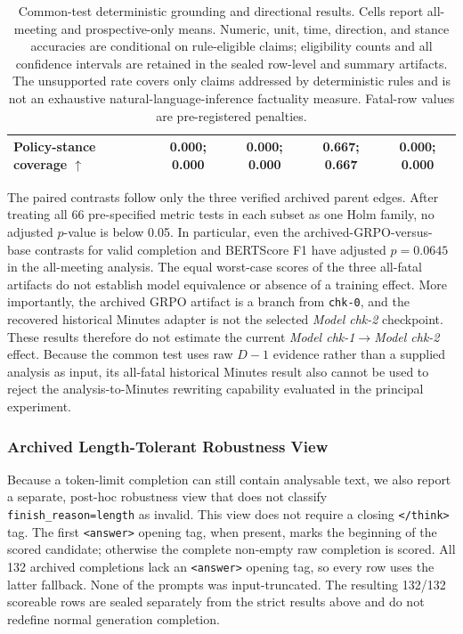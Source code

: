 \begin{table}[htbp]
\begin{tabular}{p{} c c c c}
        Policy-stance coverage $\uparrow$ & 0.000; 0.000 & 0.000; 0.000 & 0.667; 0.667 & 0.000; 0.000 \\
        \bottomrule
    \end{tabular}
    \caption{Common-test deterministic grounding and directional results.
    Cells report all-meeting and prospective-only means. Numeric, unit, time,
    direction, and stance accuracies are conditional on rule-eligible claims;
    eligibility counts and all confidence intervals are retained in the
    sealed row-level and summary artifacts. The unsupported rate covers only
    claims addressed by deterministic rules and is not an exhaustive
    natural-language-inference factuality measure. Fatal-row values are
    pre-registered penalties.}
    \label{tab:ch2:common_test_grounding}
\end{table}

The paired contrasts follow only the three verified archived parent edges.
After treating all 66 pre-specified metric tests in each subset as one Holm
family, no adjusted \(p\)-value is below 0.05.  In particular, even the
archived-GRPO-versus-base contrasts for valid completion and BERTScore F1
have adjusted \(p=0.0645\) in the all-meeting analysis.  The equal
worst-case scores of the three all-fatal artifacts do not establish model
equivalence or absence of a training effect.  More importantly, the
archived GRPO artifact is a branch from \texttt{chk-0}, and the recovered
historical Minutes adapter is not the selected \textit{Model chk-2} checkpoint.
These results therefore do not estimate the current
\textit{Model chk-1}$\rightarrow$\textit{Model chk-2} effect. Because the common test
uses raw \(D-1\) evidence rather than a supplied analysis as input, its
all-fatal historical Minutes result also cannot be used to reject the
analysis-to-Minutes rewriting capability evaluated in the principal
experiment.


\subsubsection*{Archived Length-Tolerant Robustness View}

Because a token-limit completion can still contain analysable text, we also
report a separate, post-hoc robustness view that does not classify
\texttt{finish\_reason=length} as invalid.  This view does not require a
closing \texttt{</think>} tag.  The first \texttt{<answer>} opening tag, when
present, marks the beginning of the scored candidate; otherwise the complete
non-empty raw completion is scored.  All 132 archived completions lack an
\texttt{<answer>} opening tag, so every row uses the latter fallback.  None of
the prompts was input-truncated.  The resulting 132/132 scoreable rows are
sealed separately from the strict results above and do not redefine normal
generation completion.


